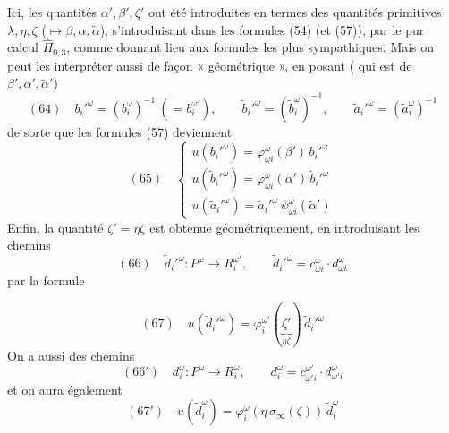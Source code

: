 \documentclass[11pt,a4paper]{article}
\begin{document}
Ici, les quantités $\alpha', \beta', \zeta'$ ont été introduites en termes des quantités primitives $\lambda, \eta, \zeta$ ($\mapsto \beta, \alpha, \tilde\alpha$), s'introduisant dans les formules (54) (et (57)), par le pur calcul   $\widehat{\Pi}_{0,3}$, comme donnant lieu aux formules les plus sympathiques. Mais on peut les interpréter aussi de façon « géométrique », en posant \struck{\ill{}} ( qui est de $\beta', \alpha', \tilde\alpha'$)
\[
(64)\quad b_i'^{\omega} = (b_i^{\omega})^{-1} \ (= b_i^{\omega'}), \qquad \tilde b_i'^{\omega} = (\tilde b_i^{\omega})^{-1}, \qquad \tilde a_i'^{\omega} = (\tilde a_i^{\omega})^{-1}
\]
de sorte que les formules (57) deviennent
\[
(65)\quad
\begin{cases}
u(b_i'^{\omega}) = \varphi^{\omega}_{\omega i}(\beta')\, b_i'^{\omega} \\
u(\tilde b_i'^{\omega}) = \varphi^{\omega}_{\omega i}(\alpha')\, \tilde b_i'^{\omega} \\
u(\tilde a_i'^{\omega}) = \tilde a_i'^{\omega}\, \psi^{\omega}_{\omega i}(\tilde\alpha')
\end{cases}
\]
Enfin, la quantité $\zeta' = \eta\zeta$ est obtenue géométriquement, en introduisant les chemins
\[
(66)\quad \tilde d_i'^{\omega} : P^{\omega} \to R_i^{\omega'}, \qquad \tilde d_i'^{\omega} = c^{\omega}_{\omega i} \cdot d^{\omega}_{\omega i}
\]
par la formule

\[
(67)\quad u(\tilde d_i'^{\omega}) = \varphi_i^{\omega'}(\underbrace{\zeta'}_{\eta\zeta})\, \tilde d_i'^{\omega}
\]
On a aussi des chemins
\[
(66')\quad d_i^{\omega} : P^{\omega} \to R_i^{\omega}, \qquad d_i^{\omega} = c^{\omega'}_{\omega' i} \cdot d^{\omega}_{\omega' i}
\]
et on aura également
\[
(67')\quad u(\tilde d_i^{\omega}) = \varphi_i^{\omega}(\eta\, \sigma_\infty(\zeta))\, \tilde d_i^{\omega}
\]
\end{document}
